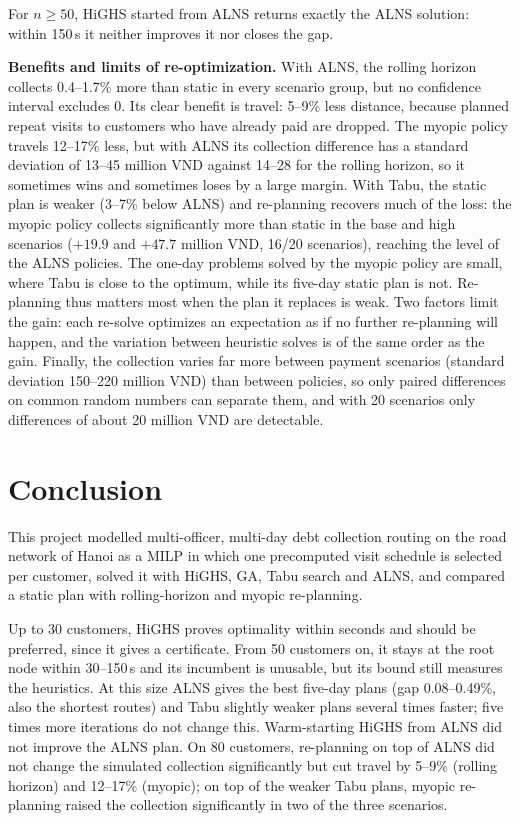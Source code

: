 \documentclass[11pt,a4paper]{article}
\begin{document}
For $n\ge50$, HiGHS started from ALNS returns exactly the ALNS solution:
within 150\,s it neither improves it nor closes the gap.

\textbf{Benefits and limits of re-optimization.} With ALNS, the rolling
horizon collects 0.4--1.7\% more than static in every scenario group, but
no confidence interval excludes 0. Its clear benefit is travel: 5--9\% less
distance, because planned repeat visits to customers who have already paid
are dropped. The myopic policy travels 12--17\% less, but with ALNS its collection
difference has a standard deviation of 13--45 million VND against 14--28 for
the rolling horizon, so it sometimes wins and sometimes loses by a large
margin. With Tabu, the static plan is weaker (3--7\% below ALNS) and
re-planning recovers much of the loss: the myopic policy collects
significantly more than static in the base and high scenarios
($+19.9$ and $+47.7$ million VND, 16/20 scenarios), reaching the level of
the ALNS policies. The one-day problems solved by the myopic policy are
small, where Tabu is close to the optimum, while its five-day static plan is
not. Re-planning thus matters most when the plan it replaces is weak. Two
factors limit the gain: each re-solve optimizes an expectation as if no
further re-planning will happen, and the variation between heuristic solves
is of the same order as the gain. Finally, the collection varies far more
between payment scenarios (standard deviation 150--220 million VND) than
between policies, so only paired differences on common random numbers can
separate them, and with 20 scenarios only differences of about 20 million
VND are detectable.

\section{Conclusion}
\label{sec:conclusion}

This project modelled multi-officer, multi-day debt collection routing on
the road network of Hanoi as a MILP in which one precomputed visit schedule
is selected per customer, solved it with HiGHS, GA, Tabu search and ALNS,
and compared a static plan with rolling-horizon and myopic re-planning.

Up to 30 customers, HiGHS proves optimality within seconds and should be
preferred, since it gives a certificate. From 50 customers on, it stays at
the root node within 30--150\,s and its incumbent is unusable, but its bound
still measures the heuristics. At this size ALNS gives the best five-day
plans (gap 0.08--0.49\%, also the shortest routes) and Tabu slightly weaker
plans several times faster; five times more iterations do not change this.
Warm-starting HiGHS from ALNS did not improve the ALNS plan. On 80
customers, re-planning on top of ALNS did not change the simulated
collection significantly but cut travel by 5--9\% (rolling horizon) and
12--17\% (myopic); on top of the weaker Tabu plans, myopic re-planning raised
the collection significantly in two of the three scenarios.
\end{document}
